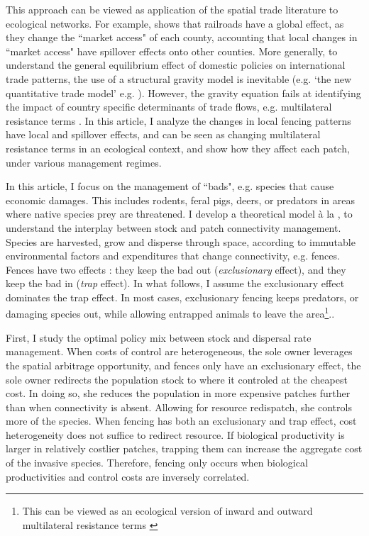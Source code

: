 This approach can be viewed as application of the spatial trade literature to ecological networks. For example, \cite{donaldson_railroads_2016} shows that railroads have a global effect, as they change the ``market access" of each county, accounting that local changes in ``market access" have spillover effects onto other counties. More generally, to understand the general equilibrium effect of domestic policies on international trade patterns, the use of a structural gravity model is inevitable (e.g. `the new quantitative trade model' e.g. \cite{arkolakis_new_2012}). However, the gravity equation fails at identifying the impact of country specific determinants of trade flows, e.g. multilateral resistance terms \citep{anderson_gravity_2003}. In this article, I analyze the  changes in local fencing patterns have local and spillover effects, and can be seen as changing multilateral resistance terms in an ecological context, and show how they affect each patch, under various management regimes. 

In this article, I focus on the management of ``bads", e.g. species that cause economic damages. This includes rodents, feral pigs, deers, or predators in areas where native species prey are threatened. I develop a theoretical model à la \cite{costello_private_2017}, to understand the interplay between stock and patch connectivity management. Species are harvested, grow and disperse through space, according to immutable environmental factors and expenditures that change connectivity, e.g. fences. Fences have two effects : they keep the bad out (\textit{exclusionary} effect), and they keep the bad in (\textit{trap} effect). In what follows, I assume the exclusionary effect dominates the trap effect. In most cases, exclusionary fencing keeps predators, or damaging species out, while allowing entrapped animals to leave the area\footnote{This can be viewed as an ecological version of inward and outward multilateral resistance terms \citep{anderson_gravity_2003}}..


First, I study the optimal policy mix between stock and dispersal rate management. When costs of control are heterogeneous, the sole owner leverages the spatial arbitrage opportunity, and fences only have an exclusionary effect, the sole owner redirects the population stock to where it controled at the cheapest cost. In doing so, she reduces the population in more expensive patches further than when connectivity is absent. Allowing for resource redispatch, she controls more of the species. When fencing has both an exclusionary and trap effect, cost heterogeneity does not suffice to redirect resource. If biological productivity is larger in relatively costlier patches, trapping them can increase the aggregate cost of the invasive species. Therefore, fencing only occurs when biological productivities and control costs are inversely correlated. 

